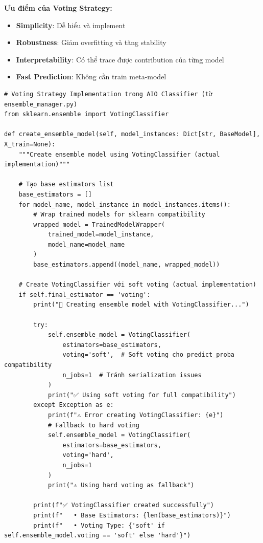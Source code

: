 \textbf{Ưu điểm của Voting Strategy:}
\begin{itemize}
    \item \textbf{Simplicity}: Dễ hiểu và implement
    \item \textbf{Robustness}: Giảm overfitting và tăng stability
    \item \textbf{Interpretability}: Có thể trace được contribution của từng model
    \item \textbf{Fast Prediction}: Không cần train meta-model
\end{itemize}

\begin{verbatim}
# Voting Strategy Implementation trong AIO Classifier (từ ensemble_manager.py)
from sklearn.ensemble import VotingClassifier

def create_ensemble_model(self, model_instances: Dict[str, BaseModel], X_train=None):
    """Create ensemble model using VotingClassifier (actual implementation)"""
    
    # Tạo base estimators list
    base_estimators = []
    for model_name, model_instance in model_instances.items():
        # Wrap trained models for sklearn compatibility
        wrapped_model = TrainedModelWrapper(
            trained_model=model_instance,
            model_name=model_name
        )
        base_estimators.append((model_name, wrapped_model))
    
    # Create VotingClassifier với soft voting (actual implementation)
    if self.final_estimator == 'voting':
        print("🔧 Creating ensemble model with VotingClassifier...")
        
        try:
            self.ensemble_model = VotingClassifier(
                estimators=base_estimators,
                voting='soft',  # Soft voting cho predict_proba compatibility
                n_jobs=1  # Tránh serialization issues
            )
            print("✅ Using soft voting for full compatibility")
        except Exception as e:
            print(f"⚠️ Error creating VotingClassifier: {e}")
            # Fallback to hard voting
            self.ensemble_model = VotingClassifier(
                estimators=base_estimators,
                voting='hard',
                n_jobs=1
            )
            print("⚠️ Using hard voting as fallback")
        
        print(f"✅ VotingClassifier created successfully")
        print(f"   • Base Estimators: {len(base_estimators)}")
        print(f"   • Voting Type: {'soft' if self.ensemble_model.voting == 'soft' else 'hard'}")
    

\end{verbatim}
